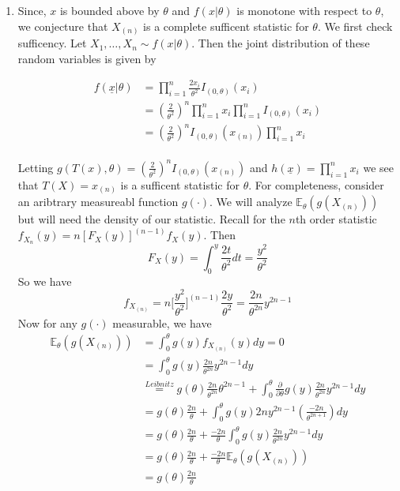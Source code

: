 \documentclass[12pt]{article}  %
\newcommand{\E}{{\mathbb{E}}}
\begin{document}
\begin{enumerate}
\begin{enumerate}
\item Since, $x$ is bounded above by $\theta$ and $f(x|\theta)$ is monotone with respect to $\theta$, we conjecture that $X_{(n)}$ is a complete sufficent statistic for $\theta$. We first check sufficency. Let $X_1, \ldots, X_n \sim f(x|\theta)$. Then the joint distribution of these random variables is given by 

\begin{align*}
f(\underline{x}|\theta) &= \prod_{i=1}^{n}\frac{2x_i}{\theta^2}I_{(0,\theta)}(x_i)\\
&= \left(\frac{2}{\theta^2}\right)^n\prod_{i=1}^{n}x_i\prod_{i=1}^{n}I_{(0,\theta)}(x_i)\\
&= \left(\frac{2}{\theta^2}\right)^nI_{(0,\theta)}(x_{(n)})\prod_{i=1}^{n}x_i\\
\end{align*}

Letting $g(T(x),\theta) = \left(\frac{2}{\theta^2}\right)^nI_{(0,\theta)}(x_{(n)})$ and $h(\underline{x}) = \prod_{i=1}^{n}x_i$ we see that $T(X) = x_{(n)}$ is a sufficent statistic for $\theta$. For completeness, consider an aribtrary measureabl function $g(\cdot)$. We will analyze $\E_{\theta}(g(X_{(n)}))$ but will need the density of our statistic. Recall for the $n$th order statistic $f_{X_{n}}(y) = n[F_{X}(y)]^{(n-1)}f_X(y)$. Then $$F_X(y) = \int_{0}^{y}\frac{2t}{\theta^2}dt = \frac{y^2}{\theta^2}$$ So we have $$f_{X_{(n)}} = n\Big[\frac{y^2}{\theta^2}\Big]^{(n-1)}\frac{2y}{\theta^2} = \frac{2n}{\theta^{2n}}y^{2n-1}$$
Now for any $g(\cdot)$ measurable, we have 
\begin{align*}
\E_{\theta}(g(X_{(n)})) &= \int_{0}^{\theta}g(y)f_{X_{(n)}}(y)dy = 0 \\
&= \int_{0}^{\theta}g(y)\frac{2n}{\theta^{2n}}y^{2n-1}dy\\
&\overset{Leibnitz}{=} g(\theta)\frac{2n}{\theta^{2n}}\theta^{2n-1} + \int_{0}^{\theta}\frac{\partial}{\partial \theta}g(y)\frac{2n}{\theta^{2n}}y^{2n-1}dy\\
&= g(\theta)\frac{2n}{\theta} + \int_{0}^{\theta}g(y)2ny^{2n-1}(\frac{-2n}{\theta^{2n+1}})dy\\
&= g(\theta)\frac{2n}{\theta} + \frac{-2n}{\theta}\int_{0}^{\theta}g(y)\frac{2n}{\theta^{2n}}y^{2n-1}dy\\
&= g(\theta)\frac{2n}{\theta} + \frac{-2n}{\theta}\E_{\theta}(g(X_{(n)}))\\
&= g(\theta)\frac{2n}{\theta}
\end{align*}


\end{enumerate}
\end{enumerate}
\end{document}
